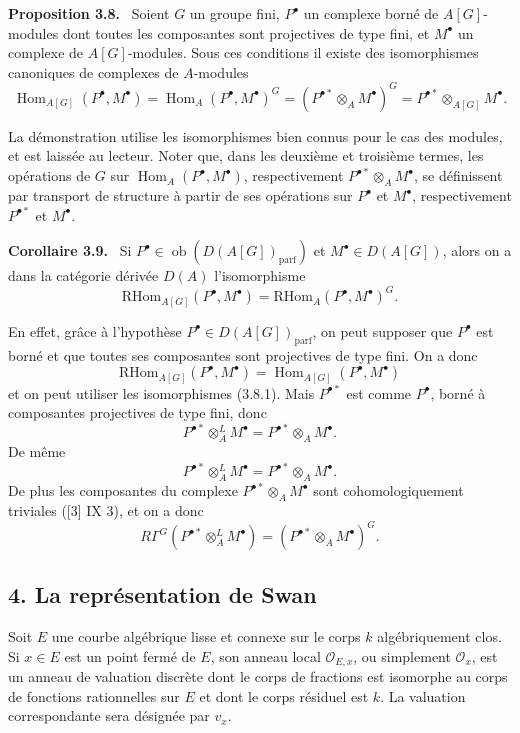 \documentclass[11pt]{article}
\newenvironment{statement}[1]{\par\medskip\noindent\textbf{#1.}\ }{\par\medskip}
\DeclareMathOperator{\Hom}{Hom}
\providecommand{\RHom}{\mathrm{RHom}}
\providecommand{\parf}{\mathrm{parf}}
\providecommand{\Ob}{\operatorname{ob}}
\providecommand{\RHom}{\mathrm{RHom}}
\providecommand{\Hom}{\operatorname{Hom}}
\providecommand{\RHom}{\mathrm R\mathcal{H}om}
\providecommand{\Ob}{\operatorname{ob}}
\providecommand{\Ob}{\operatorname{Ob}}
\providecommand{\parf}{\mathrm{parf}}
\providecommand{\RHom}{\mathrm{RHom}}
\providecommand{\Hom}{\operatorname{Hom}}
\providecommand{\Ob}{\operatorname{ob}}
\providecommand{\Ob}{\operatorname{Ob}}
\begin{document}
\begin{statement}{Proposition 3.8}
Soient $G$ un groupe fini, $P^\bullet$ un complexe borné de $A[G]$-modules dont toutes les composantes sont projectives de type fini, et $M^\bullet$ un complexe de $A[G]$-modules. Sous ces conditions il existe des isomorphismes canoniques de complexes de $A$-modules
\[
\Hom_{A[G]}(P^\bullet,M^\bullet)=\Hom_A(P^\bullet,M^\bullet)^G=(P^{\bullet *}\otimes_A M^\bullet)^G=P^{\bullet *}\otimes_{A[G]}M^\bullet.
\tag{3.8.1}
\]
\end{statement}

La démonstration utilise les isomorphismes bien connus pour le cas des modules, et est laissée au lecteur. Noter que, dans les deuxième et troisième termes, les opérations de $G$ sur $\Hom_A(P^\bullet,M^\bullet)$, respectivement $P^{\bullet *}\otimes_A M^\bullet$, se définissent par transport de structure à partir de ses opérations sur $P^\bullet$ et $M^\bullet$, respectivement $P^{\bullet *}$ et $M^\bullet$.

\begin{statement}{Corollaire 3.9}
Si $P^\bullet\in\Ob(D(A[G])_{\parf})$ et $M^\bullet\in D(A[G])$, alors on a dans la catégorie dérivée $D(A)$ l'isomorphisme
\[
\RHom_{A[G]}(P^\bullet,M^\bullet)=\RHom_A(P^\bullet,M^\bullet)^G.
\tag{3.9.1}
\]
\end{statement}

En effet, grâce à l'hypothèse $P^\bullet\in D(A[G])_{\parf}$, on peut supposer que $P^\bullet$ est borné et que toutes ses composantes sont projectives de type fini. On a donc
\[
\RHom_{A[G]}(P^\bullet,M^\bullet)=\Hom_{A[G]}(P^\bullet,M^\bullet)
\]
et on peut utiliser les isomorphismes (3.8.1). Mais $P^{\bullet *}$ est comme $P^\bullet$, borné à composantes projectives de type fini, donc
\[
P^{\bullet *}\otimes_A^L M^\bullet=P^{\bullet *}\otimes_A M^\bullet.
\]
De même
\[
P^{\bullet *}\otimes_A^L M^\bullet=P^{\bullet *}\otimes_A M^\bullet.
\]
De plus les composantes du complexe $P^{\bullet *}\otimes_A M^\bullet$ sont cohomologiquement triviales ([3] IX 3), et on a donc
\[
R\Gamma^G(P^{\bullet *}\otimes_A^L M^\bullet)=(P^{\bullet *}\otimes_A M^\bullet)^G.
\]

\subsection*{4. La représentation de Swan}

Soit $E$ une courbe algébrique lisse et connexe sur le corps $k$ algébriquement clos. Si $x\in E$ est un point fermé de $E$, son anneau local $\mathcal O_{E,x}$, ou simplement $\mathcal O_x$, est un anneau de valuation discrète dont le corps de fractions est isomorphe au corps de fonctions rationnelles sur $E$ et dont le corps résiduel est $k$. La valuation correspondante sera désignée par $v_x$.
\end{document}
